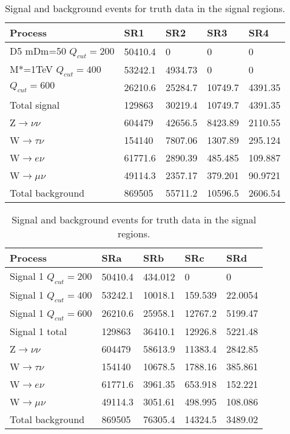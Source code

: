 \begin{table}[ht]
\begin{center}
\begin{tabular}{|l|l|l|l|l|}
\hline
Process & SR1  & SR2 & SR3 & SR4 \\ \hline
D5 mDm=50 $Q_{cut}=200$&50410.4&0&0&0 \\
M*=1TeV $Q_{cut}=400$&53242.1&4934.73&0&0 \\
$Q_{cut}=600$&26210.6&25284.7&10749.7&4391.35 \\ \hline
Total signal&129863&30219.4&10749.7&4391.35 \\ \hline
Z$\rightarrow\nu\nu$&604479&42656.5&8423.89&2110.55 \\
W$\rightarrow\tau\nu$&154140&7807.06&1307.89&295.124 \\
W$\rightarrow e\nu$&61771.6&2890.39&485.485&109.887 \\
W$\rightarrow\mu\nu$&49114.3&2357.17&379.201&90.9721 \\ \hline
Total background&869505&55711.2&10596.5&2606.54 \\ \hline
\end{tabular}
\caption{Signal and background events for truth data in the signal regions.}
\label{tab:srtruth1}
\end{center}
\end{table}
\begin{table}
\begin{center}
\begin{tabular}{|l|l|l|l|l|}
\hline
Process & SRa  & SRb & SRc & SRd \\ \hline
Signal 1 $Q_{cut}=200$&50410.4&434.012&0&0 \\
Signal 1 $Q_{cut}=400$&53242.1&10018.1&159.539&22.0054 \\
Signal 1 $Q_{cut}=600$&26210.6&25958.1&12767.2&5199.47 \\
Signal 1 total&129863&36410.1&12926.8&5221.48 \\
Z$\rightarrow\nu\nu$&604479&58613.9&11383.4&2842.85 \\
W$\rightarrow\tau\nu$&154140&10678.5&1788.16&385.861 \\
W$\rightarrow e\nu$&61771.6&3961.35&653.918&152.221 \\
W$\rightarrow\mu\nu$&49114.3&3051.61&498.995&108.086 \\
Total background&869505&76305.4&14324.5&3489.02 \\ \hline
\end{tabular}
\caption{Signal and background events for truth data in the signal regions.}
\label{tab:srtruth2}
\end{center}
\end{table}


